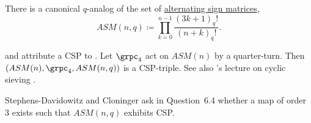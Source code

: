 There is a canonical $q$-analog of the set of \hyperref[alternatingSignMatrix]{alternating sign matrices},
\[
ASM(n,q) \coloneqq \prod_{k=0}^{n-1} \frac{(3k+1)_q!}{(n+k)_q!}.
\]

 and  attribute a
CSP to  \cite{StephensCloninger2007}.
Let $\grpc_4$ act on $ASM(n)$ by a quarter-turn.
Then $(ASM(n),\grpc_4,ASM(n,q))$ is a CSP-triple.
See also 's lecture on cyclic sieving
\cite{Reiner2018CyclicSievingVideo}.

Stephens-Davidowitz and Cloninger ask in Question~6.4 whether a map of order
$3$ exists such that $ASM(n,q)$ exhibits CSP.
